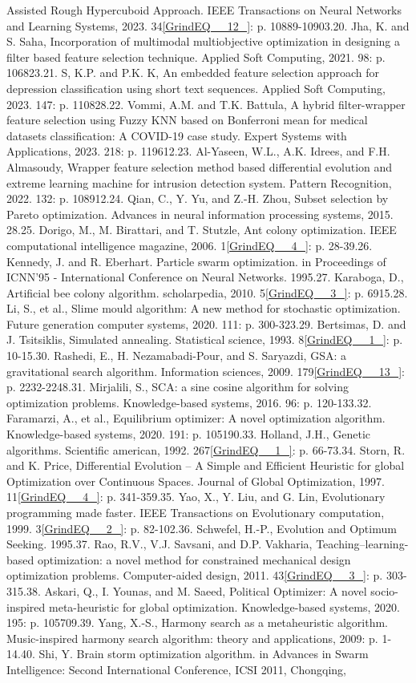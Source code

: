 \documentclass{article} %
\begin{document}
Assisted Rough Hypercuboid Approach. IEEE Transactions on Neural Networks and Learning Systems, 2023. 34\eqref{GrindEQ__12_}: p. 10889-10903.20. Jha, K. and S. Saha, Incorporation of multimodal multiobjective optimization in designing a filter based feature selection technique. Applied Soft Computing, 2021. 98: p. 106823.21. S, K.P. and P.K. K, An embedded feature selection approach for depression classification using short text sequences. Applied Soft Computing, 2023. 147: p. 110828.22. Vommi, A.M. and T.K. Battula, A hybrid filter-wrapper feature selection using Fuzzy KNN based on Bonferroni mean for medical datasets classification: A COVID-19 case study. Expert Systems with Applications, 2023. 218: p. 119612.23. Al-Yaseen, W.L., A.K. Idrees, and F.H. Almasoudy, Wrapper feature selection method based differential evolution and extreme learning machine for intrusion detection system. Pattern Recognition, 2022. 132: p. 108912.24. Qian, C., Y. Yu, and Z.-H. Zhou, Subset selection by Pareto optimization. Advances in neural information processing systems, 2015. 28.25. Dorigo, M., M. Birattari, and T. Stutzle, Ant colony optimization. IEEE computational intelligence magazine, 2006. 1\eqref{GrindEQ__4_}: p. 28-39.26. Kennedy, J. and R. Eberhart. Particle swarm optimization. in Proceedings of ICNN'95 - International Conference on Neural Networks. 1995.27. Karaboga, D., Artificial bee colony algorithm. scholarpedia, 2010. 5\eqref{GrindEQ__3_}: p. 6915.28. Li, S., et al., Slime mould algorithm: A new method for stochastic optimization. Future generation computer systems, 2020. 111: p. 300-323.29. Bertsimas, D. and J. Tsitsiklis, Simulated annealing. Statistical science, 1993. 8\eqref{GrindEQ__1_}: p. 10-15.30. Rashedi, E., H. Nezamabadi-Pour, and S. Saryazdi, GSA: a gravitational search algorithm. Information sciences, 2009. 179\eqref{GrindEQ__13_}: p. 2232-2248.31. Mirjalili, S., SCA: a sine cosine algorithm for solving optimization problems. Knowledge-based systems, 2016. 96: p. 120-133.32. Faramarzi, A., et al., Equilibrium optimizer: A novel optimization algorithm. Knowledge-based systems, 2020. 191: p. 105190.33. Holland, J.H., Genetic algorithms. Scientific american, 1992. 267\eqref{GrindEQ__1_}: p. 66-73.34. Storn, R. and K. Price, Differential Evolution -- A Simple and Efficient Heuristic for global Optimization over Continuous Spaces. Journal of Global Optimization, 1997. 11\eqref{GrindEQ__4_}: p. 341-359.35. Yao, X., Y. Liu, and G. Lin, Evolutionary programming made faster. IEEE Transactions on Evolutionary computation, 1999. 3\eqref{GrindEQ__2_}: p. 82-102.36. Schwefel, H.-P., Evolution and Optimum Seeking. 1995.37. Rao, R.V., V.J. Savsani, and D.P. Vakharia, Teaching--learning-based optimization: a novel method for constrained mechanical design optimization problems. Computer-aided design, 2011. 43\eqref{GrindEQ__3_}: p. 303-315.38. Askari, Q., I. Younas, and M. Saeed, Political Optimizer: A novel socio-inspired meta-heuristic for global optimization. Knowledge-based systems, 2020. 195: p. 105709.39. Yang, X.-S., Harmony search as a metaheuristic algorithm. Music-inspired harmony search algorithm: theory and applications, 2009: p. 1-14.40. Shi, Y. Brain storm optimization algorithm. in Advances in Swarm Intelligence: Second International Conference, ICSI 2011, Chongqing, 
\end{document}
